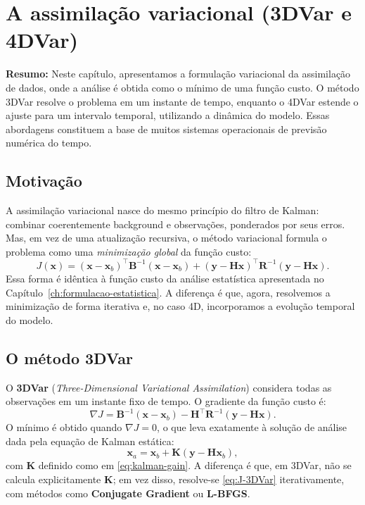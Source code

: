 \chapter{A assimilação variacional (3DVar e 4DVar)}
\label{ch:variacional}

\noindent\textbf{Resumo:}
Neste capítulo, apresentamos a formulação variacional da assimilação de dados, onde a análise é obtida como o mínimo de uma função custo.  
O método 3DVar resolve o problema em um instante de tempo, enquanto o 4DVar estende o ajuste para um intervalo temporal, utilizando a dinâmica do modelo.  
Essas abordagens constituem a base de muitos sistemas operacionais de previsão numérica do tempo.

\section{Motivação}
A assimilação variacional nasce do mesmo princípio do filtro de Kalman: combinar coerentemente background e observações, ponderados por seus erros.  
Mas, em vez de uma atualização recursiva, o método variacional formula o problema como uma \emph{minimização global} da função custo:
\begin{equation}
J(\mathbf{x}) = (\mathbf{x} - \mathbf{x}_b)^\top \mathbf{B}^{-1} (\mathbf{x} - \mathbf{x}_b)
+ (\mathbf{y} - \mathbf{H}\mathbf{x})^\top \mathbf{R}^{-1} (\mathbf{y} - \mathbf{H}\mathbf{x}).
\label{eq:J-3DVar}
\end{equation}
Essa forma é idêntica à função custo da análise estatística apresentada no Capítulo~\ref{ch:formulacao-estatistica}.  
A diferença é que, agora, resolvemos a minimização de forma iterativa e, no caso 4D, incorporamos a evolução temporal do modelo.

\section{O método 3DVar}
O \textbf{3DVar} (\emph{Three-Dimensional Variational Assimilation}) considera todas as observações em um instante fixo de tempo.  
O gradiente da função custo é:
\begin{equation}
\nabla J = \mathbf{B}^{-1} (\mathbf{x} - \mathbf{x}_b)
- \mathbf{H}^\top \mathbf{R}^{-1} (\mathbf{y} - \mathbf{H}\mathbf{x}).
\label{eq:grad3dvar}
\end{equation}
O mínimo é obtido quando $\nabla J = 0$, o que leva exatamente à solução de análise dada pela equação de Kalman estática:
\[
\mathbf{x}_a = \mathbf{x}_b + \mathbf{K} (\mathbf{y} - \mathbf{H}\mathbf{x}_b),
\]
com $\mathbf{K}$ definido como em \eqref{eq:kalman-gain}.  
A diferença é que, em 3DVar, não se calcula explicitamente $\mathbf{K}$; em vez disso, resolve-se \eqref{eq:J-3DVar} iterativamente, com métodos como \textbf{Conjugate Gradient} ou \textbf{L-BFGS}.

